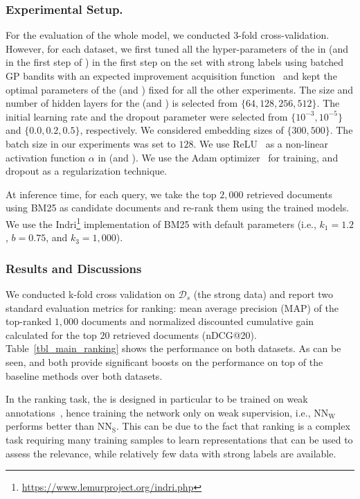 \subsubsection{Experimental Setup.}
For the evaluation of the whole model, we conducted 3-fold cross-validation. However, for each dataset, we first tuned all the hyper-parameters of the \tnet in \cws (and \std in the first step of \fwl) in the first step on the set with strong labels using batched GP bandits with an expected improvement acquisition function~\citep{Desautels:2014} and kept the optimal parameters of the \tnet (and \std) fixed for all the other experiments.
The size and number of hidden layers for the \tnet (and \std) is selected from $\{64, 128, 256, 512\}$. The initial learning rate and the dropout parameter were selected from $\{10^{-3}, 10^{-5}\}$ and $\{0.0, 0.2, 0.5\}$, respectively. We considered embedding sizes of $\{300, 500\}$. The batch size in our experiments was set to $128$.  We use ReLU~\citep{Nair:2010} as a non-linear activation function $\alpha$ in \tnet (and \std).  We use the Adam optimizer~\citep{Kingma:2014} for training, and dropout as a regularization technique.

%
At inference time, for each query, we take the top $2,000$ retrieved documents using BM25 as candidate documents and re-rank them using the trained models. We use the Indri\footnote{\url{https://www.lemurproject.org/indri.php}} implementation of BM25 with default parameters (i.e., $k_1 = 1.2$, $b = 0.75$, and $k_3 = 1,000$).

\subsubsection{Results and Discussions} 
\label{sec:res_and_disc_ranking}
We conducted k-fold cross validation on $\mathcal{D}_s$ (the strong data) and report two standard evaluation metrics for ranking: mean average precision (MAP) of the top-ranked $1,000$
documents and normalized discounted cumulative gain calculated for the top $20$ retrieved documents (nDCG@20). 
Table~\ref{tbl_main_ranking} shows the performance on both datasets. As can be seen, \fwl and \cws both provide significant boosts on the performance on top of the baseline methods over both datasets.




In the ranking task, the \std is designed in particular to be trained on weak annotations~\citep{Dehghani:2017:SIGIR}, hence training the network only on weak supervision, i.e., $\text{NN}_{\text{W}}$ performs better than $\text{NN}_{\text{S}}$. This can be due to the fact that ranking is a complex task requiring many training samples to learn representations that can be used to assess the relevance, while relatively few data with strong labels are available.

